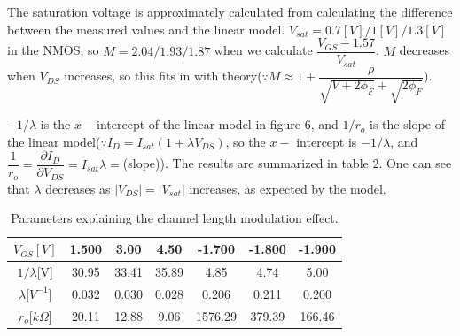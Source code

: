 \documentclass[a4paper, itemph]{oblivoir}
\theoremstyle{definition}
\begin{document}
The saturation voltage is approximately calculated from calculating the difference between the measured values and the linear model. $V_{sat}=0.7[V]/1[V]/1.3[V]$ in the NMOS, so $M=2.04/1.93/1.87$ when we calculate $\dfrac{V_{GS}-1.57}{V_{sat}}$. $M$ decreases when $V_{DS}$ increases, so this fits in with theory($\because M\approx1+\dfrac{\rho}{\sqrt{V+2\phi_F}+\sqrt{2\phi_F}}$).

$-1/\lambda$ is the $x-$intercept of the linear model in figure 6, and $1/r_o$ is the slope of the linear model($\because I_D=I_{sat}(1+\lambda V_{DS})$, so the $x-$ intercept is $-1/\lambda$, and $\dfrac{1}{r_o}=\dfrac{\partial I_D}{\partial V_{DS}}=I_{sat}\lambda=$(slope)). The results are summarized in table 2. One can see that $\lambda$ decreases as $|V_{DS}|=|V_{sat}|$ increases, as expected by the model.
\begin{table}[htb]
    \centering
    \begin{tabular}{c|c|c|c|c|c|c}
        $V_{GS}[V]$ & 1.500 & 3.00 & 4.50 & -1.700 & -1.800 & -1.900\\
        \hline
        $1/\lambda$[V] & 30.95 & 33.41 & 35.89 & 4.85 & 4.74 & 5.00\\
        \hline
        $\lambda$[$V^{-1}$] & 0.032 & 0.030 & 0.028 & 0.206 & 0.211 & 0.200\\
        \hline
        $r_o$[$k\Omega$] & 20.11 & 12.88 & 9.06 & 1576.29 & 379.39 & 166.46
    \end{tabular}
    \caption{Parameters explaining the channel length modulation effect.}
\end{table}
\end{document}

